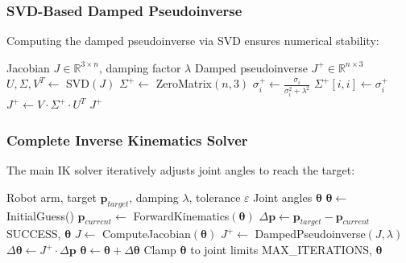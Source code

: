 \documentclass[11pt]{article}
\begin{document}
\subsubsection{SVD-Based Damped Pseudoinverse}

Computing the damped pseudoinverse via SVD ensures numerical stability:

\begin{algorithm}[H]
\caption{Damped Pseudoinverse via SVD}
\begin{algorithmic}[1]
\Require Jacobian $J \in \mathbb{R}^{3 \times n}$, damping factor $\lambda$
\Ensure Damped pseudoinverse $J^+ \in \mathbb{R}^{n \times 3}$
\State $U, \Sigma, V^T \gets$ SVD$(J)$ 
\State $\Sigma^+ \gets$ ZeroMatrix$(n, 3)$
    \State $\sigma_i^+ \gets \frac{\sigma_i}{\sigma_i^2 + \lambda^2}$ 
    \State $\Sigma^+[i, i] \gets \sigma_i^+$
\EndFor
\State $J^+ \gets V \cdot \Sigma^+ \cdot U^T$ 
\State \Return $J^+$
\end{algorithmic}
\end{algorithm}

\subsubsection{Complete Inverse Kinematics Solver}

The main IK solver iteratively adjusts joint angles to reach the target:

\begin{algorithm}[H]
\caption{Damped Least Squares IK Solver}
\begin{algorithmic}[1]
\Require Robot arm, target $\mathbf{p}_{target}$, damping $\lambda$, tolerance $\varepsilon$
\Ensure Joint angles $\boldsymbol{\theta}$
\State $\boldsymbol{\theta} \gets$ InitialGuess() 
    \State $\mathbf{p}_{current} \gets$ ForwardKinematics$(\boldsymbol{\theta})$
    \State $\Delta\mathbf{p} \gets \mathbf{p}_{target} - \mathbf{p}_{current}$
     \Return SUCCESS, $\boldsymbol{\theta}$ \EndIf
    \State $J \gets$ ComputeJacobian$(\boldsymbol{\theta})$
    \State $J^+ \gets$ DampedPseudoinverse$(J, \lambda)$
    \State $\Delta\boldsymbol{\theta} \gets J^+ \cdot \Delta\mathbf{p}$
    \State $\boldsymbol{\theta} \gets \boldsymbol{\theta} + \Delta\boldsymbol{\theta}$
    \State Clamp $\boldsymbol{\theta}$ to joint limits
\EndFor
\State \Return MAX\_ITERATIONS, $\boldsymbol{\theta}$
\end{algorithmic}
\end{algorithm}
\end{document}
